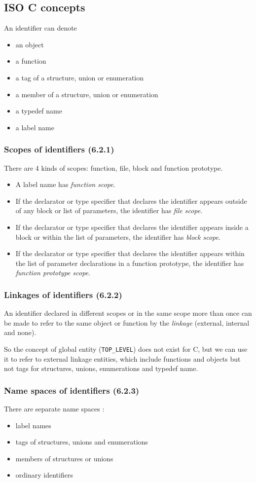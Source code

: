 \documentclass[a4paper]{article}
\begin{document}
\subsection{ISO C concepts}
An identifier can denote
\begin{itemize}
\item an object
\item a function
\item a tag of a structure, union or enumeration
\item a member of a structure, union or enumeration
\item a typedef name
\item a label name
\end{itemize}
\subsubsection{Scopes of identifiers (6.2.1)}
There are 4 kinds of scopes: function, file, block and function prototype.
\begin{itemize}
\item A label name has {\it function scope}.
\item If the declarator or type specifier that declares the identifier
  appears outside of any block or list of parameters, the identifier has
  {\it file scope}.
\item If the declarator or type specifier that declares the identifier
  appears inside a block or within the list of parameters, the identifier has
  {\it block scope}.
\item If the declarator or type specifier that declares the identifier
  appears within the list of parameter declarations in a function prototype, the identifier has
 {\it function prototype scope}.
\end{itemize}
\subsubsection{Linkages of identifiers (6.2.2)}
An identifier declared in different scopes or in the same scope more than
once can be made to refer to the same object or function by the {\it
  linkage} (external, internal and none). 

So the concept of global entity (\verb/TOP_LEVEL/) does not exist for C, but we
can use it to refer to external linkage entities, which include functions
and objects but not tags for structures, unions, enumerations and typedef name. 
\subsubsection{Name spaces of identifiers (6.2.3)}
There are separate name spaces : 
\begin{itemize}
\item label names
\item tags of structures, unions and enumerations 
\item members of structures or unions
\item ordinary identifiers 
\end{itemize}
\end{document}
